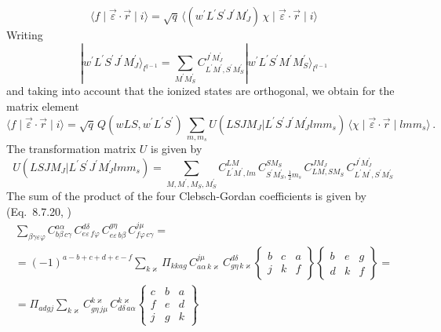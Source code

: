 \documentclass[a4paper,oneside,12pt]{extarticle}
\begin{document}
$$
\langle f \mid \vec{\varepsilon} \cdot \vec{r}  \mid i \rangle = \sqrt{q} \,
\langle (w^{\prime}L^{\prime} S^{\prime} J^{\prime} M_J^{\prime}) \,  \chi \mid \vec{\varepsilon} \cdot \vec{r}  \mid i \rangle
$$
Writing
$$
|w^{\prime} L^{\prime} S^{\prime} J^{\prime} M_J^{\prime} \rangle_{l^{q-1}} =
\sum_{M^{\prime} M_S^{\prime}} C^{J^{\prime}M_J^{\prime}}_{L^{\prime} M^{\prime}, S^{\prime} M_S^{\prime}} | w^{\prime}L^{\prime} S^{\prime} M^{\prime} M_S^{\prime} \rangle_{l^{q-1}} 
$$
and taking into account that the ionized states are orthogonal, we obtain for the matrix element
%
\begin{equation}
\langle f \mid \vec{\varepsilon} \cdot \vec{r}  \mid i \rangle = \sqrt{q} \,
Q(wLS,w^{\prime}L^{\prime}S^{\prime}) \, \sum_{m,m_s} 
U(L S J M_J | L^{\prime} S^{\prime} J^{\prime} M_J^{\prime} l m m_s) \,
\langle \chi \mid \vec{\varepsilon} \cdot \vec{r}  \mid lmm_s \rangle \,.
\label{eq:me1}
\end{equation}
%
The transformation matrix $U$ is given by
%
$$
U(L S J M_J | L^{\prime} S^{\prime} J^{\prime} M_J^{\prime} l m m_s) =
\sum_{M, M^{\prime},M_S,M_S^{\prime}}
C^{LM}_{L^{\prime} M^{\prime}, lm} \,
C^{SM_S}_{S^{\prime}M_S^{\prime}, \frac{1}{2}m_s} \, C^{J M_J}_{L M, S M_S} \,
C^{J^{\prime}M_J^{\prime}}_{L^{\prime} M^{\prime}, S^{\prime} M_S^{\prime}} \,
$$
%
%
The sum of the product of the four Clebsch-Gordan coefficients is given by
(Eq.~8.7.20, \cite{Varshalovich})
%
\begin{multline}
\sum_{\beta \gamma \varepsilon \varphi} C^{a\alpha}_{b\beta \, c\gamma} \,
C^{d \delta}_{e\varepsilon \, f\varphi} \, C^{g \eta}_{e\varepsilon \,b \beta} \,
C^{j \mu}_{f\varphi \, c \gamma} = \\ =
(-1)^{a-b+c+d+e-f} \sum_{k \varkappa}
\Pi_{kkag} \, C^{j \mu}_{a\alpha \, k\varkappa} \, C^{d \delta}_{g\eta \, k\varkappa}
\left \{
\begin{array}{ccc}
b & c & a \\
j & k & f
\end{array}
\right \}
\left \{
\begin{array}{ccc}
b & e & g \\
d & k & f
\end{array}
\right \}
%
= \\ =
%
\Pi_{adgj} \sum_{k \varkappa}
C^{k \varkappa}_{g \eta \, j \mu} \, C^{k \varkappa}_{d \delta \, a \alpha}
\left \{
\begin{array}{ccc}
c & b & a \\
f & e & d \\
j & g & k
\end{array}
\right \}
\end{multline}
\end{document}
